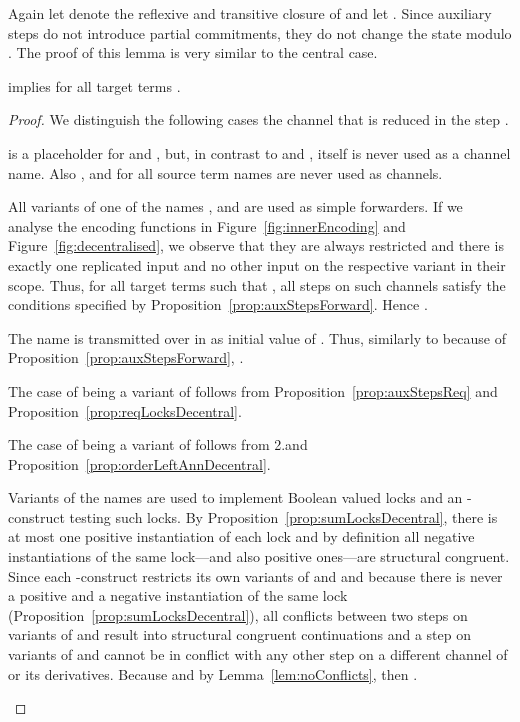 \documentclass[]{eptcs}
\begin{document}
\noindent
Again let  denote the reflexive and transitive closure of  and let .
Since auxiliary steps do not introduce partial commitments, they do not change the state modulo . The proof of this lemma is very similar to the central case.

\begin{lemma}
	 implies  for all target terms .
	\label{lem:auxStepsDecentral}
\end{lemma}

\begin{proof}
	We distinguish the following cases \wrt the channel  that is reduced in the step .
	\begin{compactenum}

		\item  is a placeholder for  and , but, in contrast to  and ,  itself is never used as a channel name. Also , and  for all source term names  are never used as channels.
		\item All variants of one of the names , and  are used as simple forwarders. If we analyse the encoding functions in Figure~\ref{fig:innerEncoding} and Figure~\ref{fig:decentralised}, we observe that they are always restricted and there is exactly one replicated input and no other input on the respective variant in their scope. Thus, for all target terms  such that , all steps on such channels satisfy the conditions specified by Proposition~\ref{prop:auxStepsForward}. Hence .
		\item The name  is transmitted over  in  as initial value of . Thus, similarly to  because of Proposition~\ref{prop:auxStepsForward}, .
		\item The case of  being a variant of  follows from Proposition~\ref{prop:auxStepsReq} and Proposition~\ref{prop:reqLocksDecentral}.
		\item The case of  being a variant of  follows from 2.\@ and Proposition~\ref{prop:orderLeftAnnDecentral}.
		\item Variants of the names  are used to implement Boolean valued locks and an -construct testing such locks. By Proposition~\ref{prop:sumLocksDecentral}, there is at most one positive instantiation of each lock and by definition all negative instantiations of the same lock---and also positive ones---are structural congruent. Since each -construct restricts its own variants of  and  and because there is never a positive and a negative instantiation of the same lock (Proposition~\ref{prop:sumLocksDecentral}), all conflicts between two steps on variants of  and  result into structural congruent continuations and a step on variants of  and  cannot be in conflict with any other step on a different channel of  or its derivatives. Because  and by Lemma~\ref{lem:noConflicts}, then .

\end{compactenum}
\end{proof}
\end{document}
